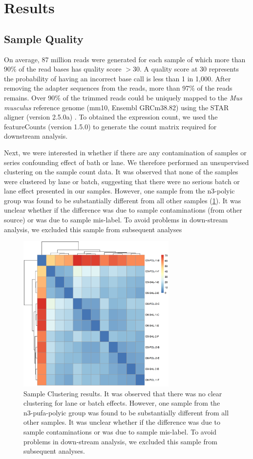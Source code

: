 \documentclass[12pt]{scrbook}
\begin{document}
\section{Results} 
\subsection{Sample Quality}
On average, 87 million reads were generated for each sample of which more than 90\% of the read bases has quality score $>30$.
A quality score at 30 represents the probability of having an incorrect base call is less than 1 in 1,000.
After removing the adapter sequences from the reads, more than 97\% of the reads remains.
Over 90\% of the trimmed reads could be uniquely mapped to the \textit{Mus musculus} reference genome (mm10, Ensembl GRCm38.82) using the STAR aligner (version 2.5.0a) \citep{Dobin2013}.
To obtained the expression count, we used the featureCounts (version 1.5.0) \citep{Liao2014} to generate the count matrix required for downstream analysis.

Next, we were interested in whether if there are any contamination of samples or series confounding effect of bath or lane.
We therefore performed an unsupervised clustering on the sample count data.
It was observed that none of the samples were clustered by lane or batch, suggesting that there were no serious batch or lane effect presented in our samples.
However, one sample from the n3-\gls{polyic} group was found to be substantially different from all other samples (\cref{fig:distMatrix}).
It was unclear whether if the difference was due to sample contaminations (from other source) or was due to sample mis-label.
To avoid problems in down-stream analysis, we excluded this sample from subsequent analyses
\begin{figure}
	\centering
	\includegraphics[width=0.7\textwidth]{figure/DistanceMatrix.png}
	\caption[Sample Clustering]{Sample Clustering results.
		It was observed that there was no clear clustering for lane or batch effects.
		However, one sample from the n3-\gls{pufa}-\gls{polyic} group was found to be substantially different from all other samples.
		It was unclear whether if the difference was due to sample contaminations or was due to sample mis-label. To avoid problems in down-stream analysis, we excluded this sample from subsequent analyses. }
	\label{fig:distMatrix}
\end{figure}
\end{document}
